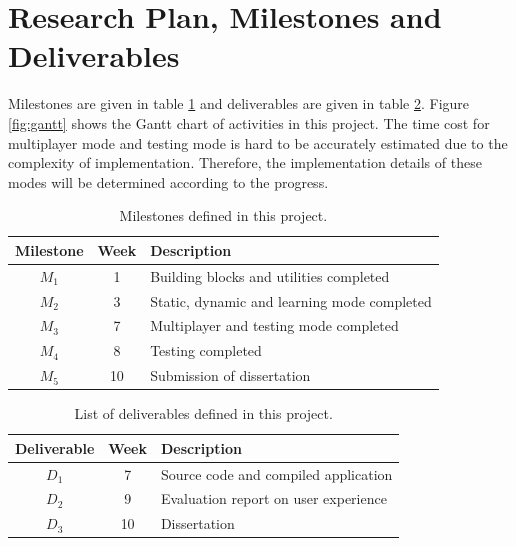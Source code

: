 \documentclass[a4paper,11pt]{article}
\begin{document}
\section{Research Plan, Milestones and Deliverables}

Milestones are given in table \ref{tab:milestones} and deliverables are given in table \ref{tab:deliverables}. Figure \ref{fig:gantt} shows the Gantt chart of activities in this project. The time cost for multiplayer mode and testing mode is hard to be accurately estimated due to the complexity of implementation. Therefore, the implementation details of these modes will be determined according to the progress.

\begin{table}[!htb]
    \begin{center}
        \begin{tabular}{|c|c|l|}
        \hline
        \textbf{Milestone} & \textbf{Week} & \textbf{Description} \\
        \hline
        $M_1$ & 1 & Building blocks and utilities completed \\
        $M_2$ & 3 & Static, dynamic and learning mode completed \\
        $M_3$ & 7 & Multiplayer and testing mode completed \\
        $M_4$ & 8 & Testing completed \\
        $M_5$ & 10 & Submission of dissertation \\
        \hline
        \end{tabular} 
    \end{center}
    \vspace{-1em}
    \caption{Milestones defined in this project.}
    \label{tab:milestones}
\end{table}

\begin{table}[!htb]
    \begin{center}
        \begin{tabular}{|c|c|l|}
        \hline
        \textbf{Deliverable} & \textbf{Week} & \textbf{Description} \\
        \hline
        $D_1$ & 7 & Source code and compiled application \\
        $D_2$ & 9 & Evaluation report on user experience\\
        $D_3$ & 10 & Dissertation \\
        \hline
        \end{tabular} 
    \end{center}
    \vspace{-1em}
    \caption{List of deliverables defined in this project.}
    \label{tab:deliverables}
\end{table}
\end{document}
